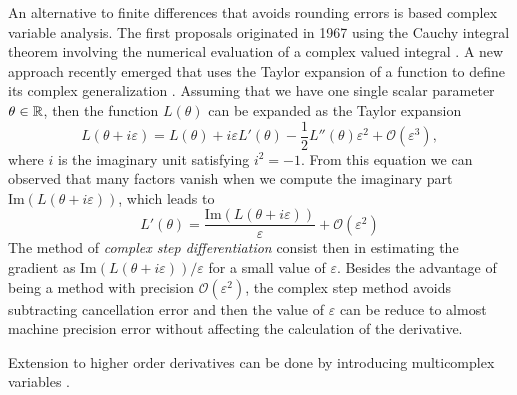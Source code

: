 An alternative to finite differences that avoids rounding errors is based complex variable analysis. 
The first proposals originated in 1967 using the Cauchy integral theorem involving the numerical evaluation of a complex valued integral \cite{Lyness_1967, Lyness_Moler_1967}.
A new approach recently emerged that uses the Taylor expansion of a function to define its complex generalization \cite{Squire_Trapp_1998_complex_diff, Martins_Sturdza_Alonso_2003_complex_differentiation}. 
Assuming that we have one single scalar parameter $\theta \in \operatorname{\mathbb{R}}$, then the function $L(\theta)$ can be expanded as 
the Taylor expansion
\begin{equation}
    L(\theta + i \varepsilon)
    = 
    L(\theta) + i \varepsilon L'(\theta) 
    - 
    \frac 1 2
    L''(\theta) \varepsilon^2
    + 
    \mathcal O (\varepsilon^3),
\end{equation}
where $i$ is the imaginary unit satisfying $i^2 = -1$. 
From this equation we can observed that many factors vanish when we compute the imaginary part $\text{Im}(L(\theta + i \varepsilon))$, which leads to
\begin{equation}
    L'(\theta) 
    = 
    \frac{\text{Im}(L(\theta + i \varepsilon))}{\varepsilon}
    + 
    \mathcal{O} (\varepsilon^2)
\end{equation}
The method of \textit{complex step differentiation} consist then in estimating the gradient as $\text{Im}(L(\theta + i \varepsilon)) / \varepsilon$ for a small value of $\varepsilon$. 
Besides the advantage of being a method with precision $\mathcal{O}(\varepsilon^2)$, the complex step method avoids subtracting cancellation error and then the value of $\varepsilon$ can be reduce to almost machine precision error without affecting the calculation of the derivative. 

Extension to higher order derivatives can be done by introducing multicomplex variables \cite{Lantoine_Russell_Dargent_2012}. 